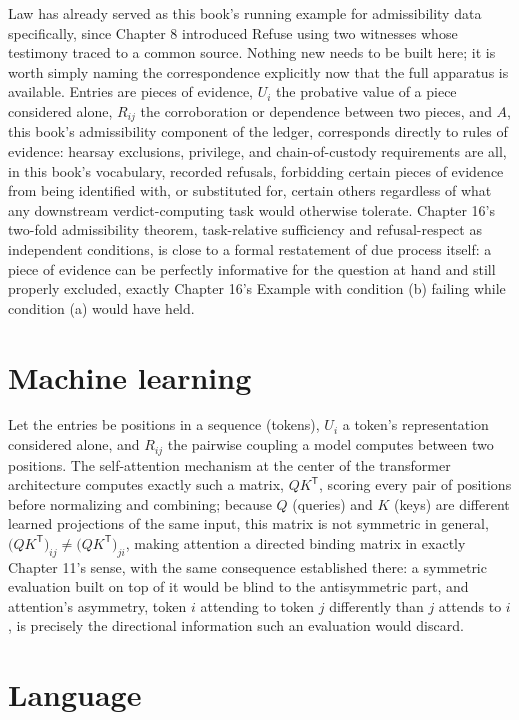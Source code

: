 \documentclass[11pt]{book}
\begin{document}
Law has already served as this book's running example for admissibility data specifically, since Chapter 8 introduced Refuse using two witnesses whose testimony traced to a common source. Nothing new needs to be built here; it is worth simply naming the correspondence explicitly now that the full apparatus is available. Entries are pieces of evidence, $U_i$ the probative value of a piece considered alone, $R_{ij}$ the corroboration or dependence between two pieces, and $A$, this book's admissibility component of the ledger, corresponds directly to rules of evidence: hearsay exclusions, privilege, and chain-of-custody requirements are all, in this book's vocabulary, recorded refusals, forbidding certain pieces of evidence from being identified with, or substituted for, certain others regardless of what any downstream verdict-computing task would otherwise tolerate. Chapter 16's two-fold admissibility theorem, task-relative sufficiency and refusal-respect as independent conditions, is close to a formal restatement of due process itself: a piece of evidence can be perfectly informative for the question at hand and still properly excluded, exactly Chapter 16's Example with condition (b) failing while condition (a) would have held.

\section{Machine learning}

Let the entries be positions in a sequence (tokens), $U_i$ a token's representation considered alone, and $R_{ij}$ the pairwise coupling a model computes between two positions. The self-attention mechanism at the center of the transformer architecture computes exactly such a matrix, $QK^{\mathsf T}$, scoring every pair of positions before normalizing and combining; because $Q$ (queries) and $K$ (keys) are different learned projections of the same input, this matrix is not symmetric in general, $\bigl(QK^{\mathsf T}\bigr)_{ij}\ne\bigl(QK^{\mathsf T}\bigr)_{ji}$, making attention a directed binding matrix in exactly Chapter 11's sense, with the same consequence established there: a symmetric evaluation built on top of it would be blind to the antisymmetric part, and attention's asymmetry, token $i$ attending to token $j$ differently than $j$ attends to $i$, is precisely the directional information such an evaluation would discard.

\section{Language}
\end{document}
